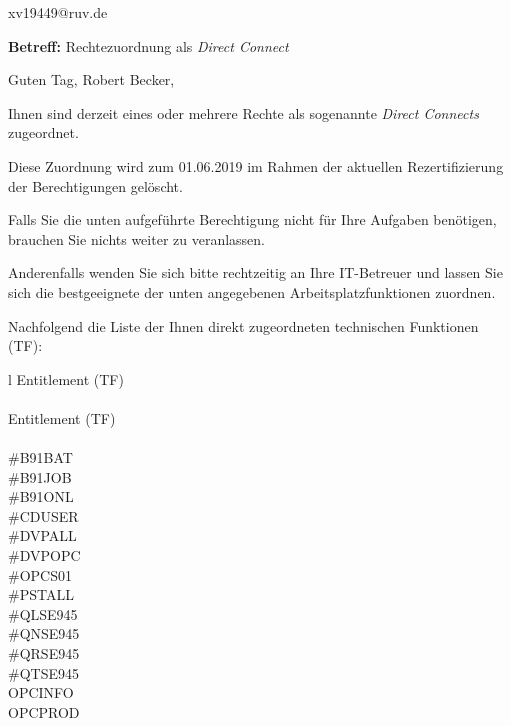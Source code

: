 \documentclass[a4paper,landscape,12pt]{letter}
\begin{document}
\begin{letter}{xv19449@ruv.de\hfill \break}
\begin{normalsize}
	\opening{\textbf{Betreff:} Rechtezuordnung als \emph{Direct Connect}}
	\begin{normalsize} \hfill
	\end{normalsize}

	\begin{normalsize}
		Guten Tag, 
	Robert Becker, \hfill \break
	\end{normalsize}
	\end{normalsize}
	
\begin{normalsize}
	Ihnen sind derzeit eines oder mehrere Rechte als sogenannte \emph{Direct Connects} zugeordnet.
	
	Diese Zuordnung wird zum 01.06.2019 im Rahmen der aktuellen Rezertifizierung der Berechtigungen gelöscht.
	
	Falls Sie die unten aufgeführte Berechtigung nicht für Ihre Aufgaben benötigen, 
	brauchen Sie nichts weiter zu veranlassen.
	
	Anderenfalls wenden Sie sich bitte rechtzeitig an Ihre IT-Betreuer 
	und lassen Sie sich die bestgeeignete der unten angegebenen Arbeitsplatzfunktionen zuordnen.
	\end{normalsize}
	
\begin{normalsize}
	Nachfolgend die Liste der Ihnen direkt zugeordneten technischen Funktionen (TF):

	\begin{longtable}{l}
		Entitlement (TF) \\ \hline
		\endfirsthead
		\\\hline
		Entitlement (TF) \\ \hline
		\endhead %
		\multicolumn{1}{r@{}}{Fortsetzung \ldots}\\
		\endfoot
		\hline
		\endlastfoot
	\#B91BAT\\\#B91JOB\\\#B91ONL\\\#CDUSER\\\#DVPALL\\\#DVPOPC\\\#OPCS01\\\#PSTALL\\\#QLSE945\\\#QNSE945\\\#QRSE945\\\#QTSE945\\OPCINFO\\OPCPROD\\
	\end{longtable}
	\end{normalsize}
	

\end{letter}
\end{document}

